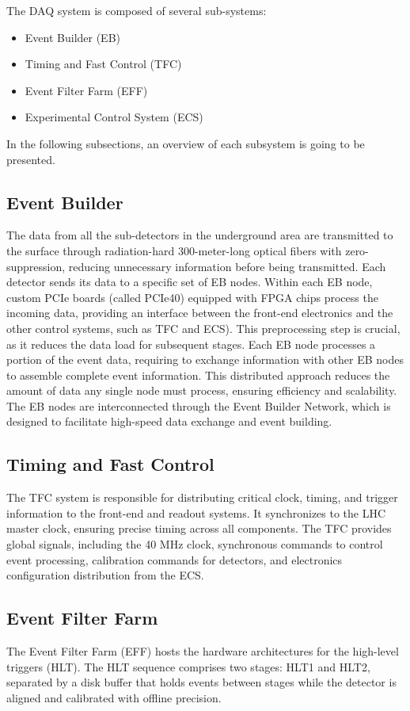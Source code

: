 The DAQ system is composed of several sub-systems:
\begin{itemize}
\item Event Builder (EB)
\item Timing and Fast Control (TFC)
\item Event Filter Farm (EFF)
\item Experimental Control System (ECS)
\end{itemize}
In the following subsections, an overview of each subsystem is going to be presented. 

\subsection{Event Builder}
The data from all the sub-detectors in the underground area are transmitted to the surface through radiation-hard 300-meter-long optical fibers with zero-suppression, reducing unnecessary information before being transmitted. Each detector sends its data to a specific set of EB nodes. Within each EB node, custom PCIe boards (called PCIe40) equipped with FPGA chips process the incoming data, providing an interface between the front-end electronics and the other control systems, such as TFC and ECS). This preprocessing step is crucial, as it reduces the data load for subsequent stages. Each EB node processes a portion of the event data, requiring to exchange information with other EB nodes to assemble complete event information. This distributed approach reduces the amount of data any single node must process, ensuring efficiency and scalability. The EB nodes are interconnected through the Event Builder Network, which is designed to facilitate high-speed data exchange and event building.




\subsection{Timing and Fast Control}
The TFC system is responsible for distributing critical clock, timing, and trigger information to the front-end and readout systems. It synchronizes to the LHC master clock, ensuring precise timing across all components. The TFC provides global signals, including the 40 MHz clock, synchronous commands to control event processing, calibration commands for detectors, and electronics configuration distribution from the ECS.

\subsection{Event Filter Farm}
The Event Filter Farm (EFF) hosts the hardware architectures for the high-level triggers (HLT). The HLT sequence comprises two stages: HLT1 and HLT2, separated by a disk buffer that holds events between stages while the detector is aligned and calibrated with offline precision.
